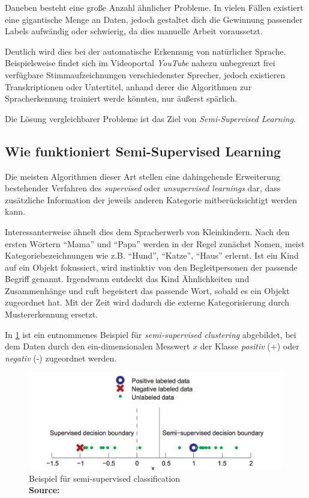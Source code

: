 \documentclass[runningheads,a4paper]{llncs}
\newcommand*{\captionsource}[2]{%
  \caption[{#1}]{%
    #1%
    \\\hspace{\linewidth}%
    \textbf{Source:} #2%
  }%
}
\begin{document}
Daneben besteht eine große Anzahl ähnlicher Probleme. In vielen Fällen existiert eine gigantische Menge an Daten, jedoch gestaltet dich die Gewinnung passender Labels aufwändig oder schwierig, da dies manuelle Arbeit voraussetzt.

Deutlich wird dies bei der automatische Erkennung von natürlicher Sprache. Beispielsweise findet sich im Videoportal \emph{YouTube} nahezu unbegrenzt frei verfügbare Stimmaufzeichnungen verschiedenster Sprecher, jedoch existieren  Transkriptionen oder Untertitel, anhand derer die Algorithmen zur Spracherkennung trainiert werde könnten, nur äußerst spärlich. 

Die Lösung vergleichbarer Probleme ist das Ziel von \emph{Semi-Supervised Learning}.


\subsection{Wie funktioniert Semi-Supervised Learning}

Die meisten Algorithmen dieser Art stellen eine dahingehende Erweiterung bestehender Verfahren des \emph{supervised} oder \emph{unsupervised learnings} dar, dass zusätzliche Information der jeweils anderen Kategorie mitberücksichtigt werden kann.

Interessanterweise ähnelt dies dem Spracherwerb von Kleinkindern. Nach den ersten Wörtern \enquote{Mama} und \enquote{Papa} werden in der Regel zunächst Nomen, meist Kategoriebezeichnungen wie z.B. \enquote{Hund}, \enquote{Katze}, \enquote{Haus} erlernt. Ist ein Kind auf ein Objekt fokussiert, wird instinktiv von den Begleitpersonen der passende Begriff genannt. Irgendwann entdeckt das Kind Ähnlichkeiten und Zusammenhänge und ruft begeistert das passende Wort, sobald es ein Objekt zugeordnet hat. Mit der Zeit wird dadurch die externe Kategorisierung durch Mustererkennung ersetzt.\cite{zhu_goldberg_2009}

In \ref{fig:ss-clust} ist ein \cite{zhu_goldberg_2009} entnommenes Beispiel für \emph{semi-supervised clustering} abgebildet, bei dem Daten durch den ein-dimensionalen Messwert $x$ der Klasse \emph{positiv} (+) oder \emph{negativ} (-) zugeordnet werden. 

\begin{figure} [ht]
  \centering
  \includegraphics[width=1\textwidth]{res/ss_classification.png}
      \captionsource{Beispiel für semi-supervised classification}{\cite{zhu_goldberg_2009}}
  \label{fig:ss-clust}
\end{figure}
\end{document}
